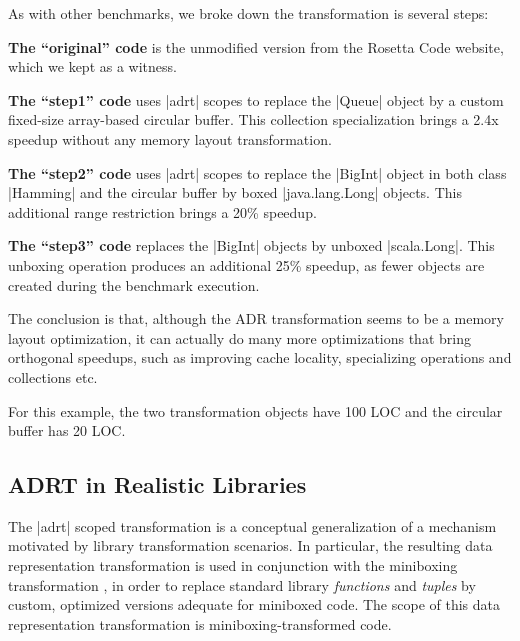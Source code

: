 As with other benchmarks, we broke down the transformation is several steps:

\vspace{0.5em}
\noindent
\textbf{The ``original'' code} is the unmodified version from the Rosetta Code website, which we kept as a witness.

\vspace{0.5em}
\noindent
\textbf{The ``step1'' code} uses |adrt| scopes to replace the |Queue| object by a custom fixed-size array-based circular buffer. This collection specialization brings a 2.4x speedup without any memory layout transformation.

\vspace{0.5em}
\noindent
\textbf{The ``step2'' code} uses |adrt| scopes to replace the |BigInt| object in both class |Hamming| and the circular buffer by boxed |java.lang.Long| objects. This additional range restriction brings a 20\% speedup.

\vspace{0.5em}
\noindent
\textbf{The ``step3'' code} replaces the |BigInt| objects by unboxed |scala.Long|. This unboxing operation produces an additional 25\% speedup, as fewer objects are created during the benchmark execution.

The conclusion is that, although the ADR transformation seems to be a memory layout optimization, it can actually do many more optimizations that bring orthogonal speedups, such as improving cache locality, specializing operations and collections etc.

For this example, the two transformation objects have 100 LOC and the circular buffer has 20 LOC.

\subsection{ADRT in Realistic Libraries}
\label{sec:benchmarks:funcs}


The |adrt| scoped transformation is a conceptual generalization of a mechanism
motivated by library transformation scenarios. In particular, the
resulting data representation transformation is used in conjunction
with the miniboxing transformation \cite{miniboxing-www, miniboxing},
in order to replace standard library \emph{functions} and \emph{tuples}
by custom, optimized versions adequate for miniboxed code.
The scope of this data representation transformation is miniboxing-transformed code.

